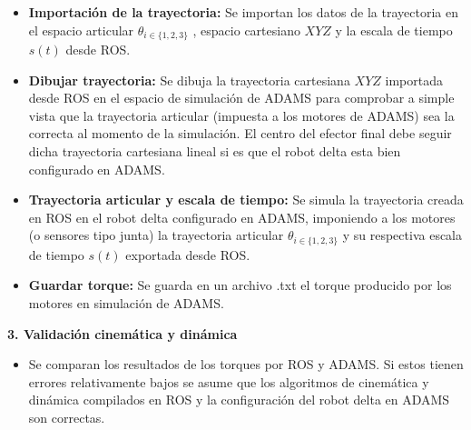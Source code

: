         \begin{itemize}
            \item {\textbf{Importación de la trayectoria:} Se importan los datos de la trayectoria en el espacio articular $\theta_{i\in\{1,2,3\}}$ , espacio cartesiano $XYZ$ y la escala de tiempo $s(t)$ desde ROS.}
            \item {\textbf{Dibujar trayectoria:} Se dibuja la trayectoria cartesiana $XYZ$ importada desde ROS en el espacio de simulación de ADAMS para comprobar a simple vista que la trayectoria articular (impuesta a los motores de ADAMS) sea la correcta al momento de la simulación. El centro del efector final debe seguir dicha trayectoria cartesiana lineal si es que el robot delta esta bien configurado en ADAMS.}
            \item {\textbf{Trayectoria articular y escala de tiempo:} Se simula la trayectoria creada en ROS en el robot delta configurado en ADAMS, imponiendo a los motores (o sensores tipo junta) la trayectoria articular $\theta_{i\in\{1,2,3\}}$ y su respectiva escala de tiempo $s(t)$ exportada desde ROS.}
            \item {\textbf{Guardar torque:} Se guarda en un archivo .txt el torque producido por los motores en simulación de ADAMS.  }
        \end{itemize}
        \item \textbf{3. \textcolor[gray]{0.3}{Validación 
        cinemática y dinámica}}
        \begin{itemize}
            \item {Se comparan los resultados de los torques por ROS y ADAMS. Si estos tienen errores relativamente bajos se asume que los algoritmos de cinemática y dinámica compilados en ROS y la configuración del robot delta en ADAMS son correctas.}
        \end{itemize}  

        \newpage
        
